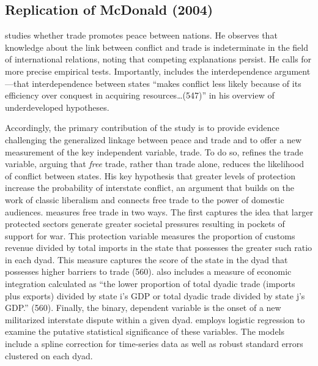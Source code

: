
\newpage
\subsection{Replication of McDonald (2004)}

\citet{mcdonald:2004} studies whether trade promotes peace between nations. He observes that knowledge about the link between conflict and trade is indeterminate in the field of international relations, noting that competing explanations persist. He calls for more precise empirical tests.  Importantly, \citet{mcdonald:2004} includes the interdependence argument---that interdependence between states ``makes conflict less likely because of its efficiency over conquest in acquiring resources\ldots (547)'' in his overview of underdeveloped hypotheses. 

Accordingly, the primary contribution of the study is to provide evidence challenging the generalized linkage between peace and trade and to offer a new measurement of the key independent variable, trade. To do so, \citet{mcdonald:2004} refines the trade variable, arguing that \textit{free} trade, rather than trade alone, reduces the likelihood of conflict between states. His key hypothesis that greater levels of protection increase the probability of interstate conflict, an argument that builds on the work of classic liberalism and connects free trade to the power of domestic audiences. \citet{mcdonald:2004} measures free trade in two ways. The first  captures the idea that larger protected sectors generate greater societal pressures resulting in  pockets of support for war. This protection variable measures the proportion of customs revenue divided by total imports in the state that possesses the greater such ratio in each dyad. This measure captures the score of the state in the dyad that possesses higher barriers to trade (560). \citet{mcdonald:2004} also includes a measure of economic integration  calculated as ``the lower proportion of total dyadic trade (imports plus exports) divided by state i's GDP or total dyadic trade divided by state j's GDP.'' (560). Finally, the binary, dependent variable is the onset of a new militarized interstate dispute within a given dyad. \citet{mcdonald:2004} employs logistic regression to examine the putative statistical significance of these variables. The models include a spline correction for time-series data as well as robust standard errors clustered on each dyad.

